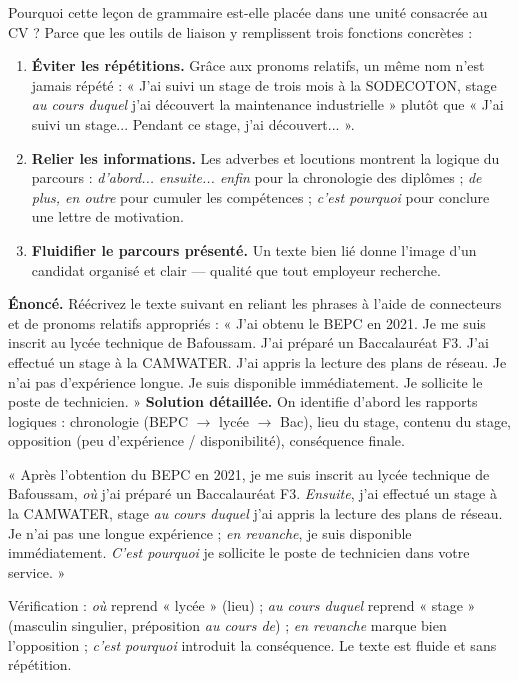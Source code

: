 \documentclass[11pt]{article}
\begin{document}
Pourquoi cette leçon de grammaire est-elle placée dans une unité consacrée au CV ? Parce que les outils de liaison y remplissent trois fonctions concrètes :

\begin{enumerate}
\item \textbf{Éviter les répétitions.} Grâce aux pronoms relatifs, un même nom n'est jamais répété : « J'ai suivi un stage de trois mois à la SODECOTON, stage \emph{au cours duquel} j'ai découvert la maintenance industrielle » plutôt que « J'ai suivi un stage... Pendant ce stage, j'ai découvert... ».
\item \textbf{Relier les informations.} Les adverbes et locutions montrent la logique du parcours : \emph{d'abord... ensuite... enfin} pour la chronologie des diplômes ; \emph{de plus, en outre} pour cumuler les compétences ; \emph{c'est pourquoi} pour conclure une lettre de motivation.
\item \textbf{Fluidifier le parcours présenté.} Un texte bien lié donne l'image d'un candidat organisé et clair — qualité que tout employeur recherche.
\end{enumerate}

\begin{exoresolu}
\textbf{Énoncé.} Réécrivez le texte suivant en reliant les phrases à l'aide de connecteurs et de pronoms relatifs appropriés : « J'ai obtenu le BEPC en 2021. Je me suis inscrit au lycée technique de Bafoussam. J'ai préparé un Baccalauréat F3. J'ai effectué un stage à la CAMWATER. J'ai appris la lecture des plans de réseau. Je n'ai pas d'expérience longue. Je suis disponible immédiatement. Je sollicite le poste de technicien. »
\tcblower
\textbf{Solution détaillée.} On identifie d'abord les rapports logiques : chronologie (BEPC $\rightarrow$ lycée $\rightarrow$ Bac), lieu du stage, contenu du stage, opposition (peu d'expérience / disponibilité), conséquence finale.

« Après l'obtention du BEPC en 2021, je me suis inscrit au lycée technique de Bafoussam, \emph{où} j'ai préparé un Baccalauréat F3. \emph{Ensuite}, j'ai effectué un stage à la CAMWATER, stage \emph{au cours duquel} j'ai appris la lecture des plans de réseau. Je n'ai pas une longue expérience ; \emph{en revanche}, je suis disponible immédiatement. \emph{C'est pourquoi} je sollicite le poste de technicien dans votre service. »

Vérification : \emph{où} reprend « lycée » (lieu) ; \emph{au cours duquel} reprend « stage » (masculin singulier, préposition \emph{au cours de}) ; \emph{en revanche} marque bien l'opposition ; \emph{c'est pourquoi} introduit la conséquence. Le texte est fluide et sans répétition.
\end{exoresolu}
\end{document}
